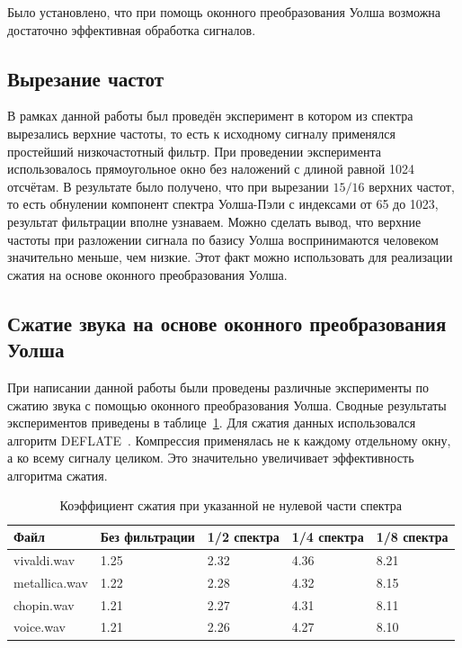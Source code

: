 \documentclass{matmex-diploma-custom}
\begin{document}
Было установлено, что при помощь оконного преобразования Уолша возможна
достаточно эффективная обработка сигналов.

\subsection{Вырезание частот}
В рамках данной работы был проведён эксперимент в котором из спектра вырезались верхние частоты, то есть
к исходному сигналу применялся простейший низкочастотный фильтр.
При проведении эксперимента использовалось прямоугольное окно без наложений с длиной
равной 1024 отсчётам.
В результате было получено,
что при вырезании $15/16$ верхних частот, то есть обнулении компонент спектра
Уолша-Пэли с индексами от 65 до 1023, результат фильтрации вполне узнаваем.
Можно сделать вывод, что верхние частоты при разложении сигнала по
базису Уолша воспринимаются человеком значительно меньше, чем низкие.
Этот факт можно использовать для реализации сжатия на основе 
оконного преобразования Уолша.

\subsection{Сжатие звука на основе оконного преобразования Уолша}
При написании данной работы были проведены различные эксперименты
по сжатию звука с помощью оконного преобразования Уолша. Сводные результаты
экспериментов приведены в таблице~\ref{tab:compression-ratio}. 
Для сжатия данных использовался алгоритм DEFLATE~\cite{deflate-spec}.
Компрессия применялась не к каждому отдельному окну, а ко всему
сигналу целиком. Это значительно увеличивает эффективность
алгоритма сжатия.

\begin{table}
  \centering
    \begin{tabular}{ | p{2.4cm} | l | l | l | l |}
    \hline
    Файл & Без фильтрации & 1/2 спектра & 1/4 спектра & 1/8 спектра \\ \hline
    vivaldi.wav     & 1.25  & 2.32  & 4.36  & 8.21 \\ \hline
    metallica.wav   & 1.22  & 2.28  & 4.32  & 8.15 \\ \hline
    chopin.wav      & 1.21  & 2.27  & 4.31  & 8.11 \\ \hline
    voice.wav       & 1.21  & 2.26  & 4.27  & 8.10 \\ \hline
    \end{tabular}
    \caption{Коэффициент сжатия при указанной не нулевой части спектра}
    \label{tab:compression-ratio}
\end{table}
\end{document}
